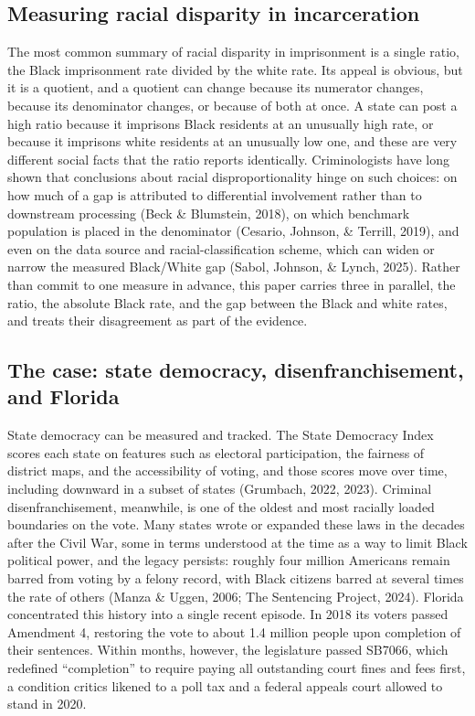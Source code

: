 \documentclass[
  12pt,
]{article}
\begin{document}
\subsection{Measuring racial disparity in
incarceration}\label{measuring-racial-disparity-in-incarceration}

The most common summary of racial disparity in imprisonment is a single
ratio, the Black imprisonment rate divided by the white rate. Its appeal
is obvious, but it is a quotient, and a quotient can change because its
numerator changes, because its denominator changes, or because of both
at once. A state can post a high ratio because it imprisons Black
residents at an unusually high rate, or because it imprisons white
residents at an unusually low one, and these are very different social
facts that the ratio reports identically. Criminologists have long shown
that conclusions about racial disproportionality hinge on such choices:
on how much of a gap is attributed to differential involvement rather
than to downstream processing (Beck \& Blumstein, 2018), on which
benchmark population is placed in the denominator (Cesario, Johnson, \&
Terrill, 2019), and even on the data source and racial-classification
scheme, which can widen or narrow the measured Black/White gap (Sabol,
Johnson, \& Lynch, 2025). Rather than commit to one measure in advance,
this paper carries three in parallel, the ratio, the absolute Black
rate, and the gap between the Black and white rates, and treats their
disagreement as part of the evidence.

\subsection{The case: state democracy, disenfranchisement, and
Florida}\label{the-case-state-democracy-disenfranchisement-and-florida}

State democracy can be measured and tracked. The State Democracy Index
scores each state on features such as electoral participation, the
fairness of district maps, and the accessibility of voting, and those
scores move over time, including downward in a subset of states
(Grumbach, 2022, 2023). Criminal disenfranchisement, meanwhile, is one
of the oldest and most racially loaded boundaries on the vote. Many
states wrote or expanded these laws in the decades after the Civil War,
some in terms understood at the time as a way to limit Black political
power, and the legacy persists: roughly four million Americans remain
barred from voting by a felony record, with Black citizens barred at
several times the rate of others (Manza \& Uggen, 2006; The Sentencing
Project, 2024). Florida concentrated this history into a single recent
episode. In 2018 its voters passed Amendment 4, restoring the vote to
about 1.4 million people upon completion of their sentences. Within
months, however, the legislature passed SB7066, which redefined
``completion'' to require paying all outstanding court fines and fees
first, a condition critics likened to a poll tax and a federal appeals
court allowed to stand in 2020.
\end{document}
